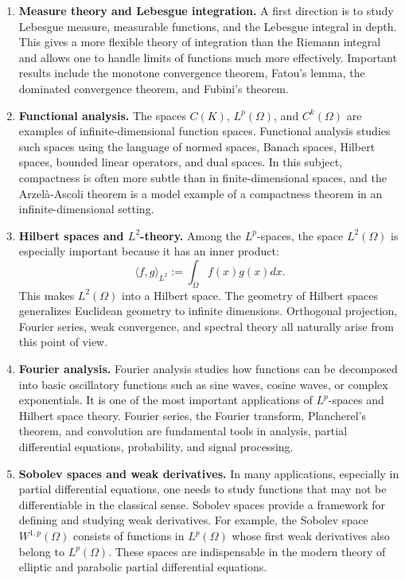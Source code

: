 \begin{enumerate}
    \item \textbf{Measure theory and Lebesgue integration.} A first direction is to study Lebesgue measure, measurable functions, and the Lebesgue integral in depth. This gives a more flexible theory of integration than the Riemann integral and allows one to handle limits of functions much more effectively. Important results include the monotone convergence theorem, Fatou's lemma, the dominated convergence theorem, and Fubini's theorem.
    
    \item \textbf{Functional analysis.} The spaces $C(K)$, $L^{p}(\Omega)$, and $C^{k}(\Omega)$ are examples of infinite-dimensional function spaces. Functional analysis studies such spaces using the language of normed spaces, Banach spaces, Hilbert spaces, bounded linear operators, and dual spaces. In this subject, compactness is often more subtle than in finite-dimensional spaces, and the Arzelà-Ascoli theorem is a model example of a compactness theorem in an infinite-dimensional setting.
    
    \item \textbf{Hilbert spaces and $L^{2}$-theory.} Among the $L^p$-spaces, the space $L^{2}(\Omega)$ is especially important because it has an inner product:
    \[ \langle f,g \rangle_{L^{2}} := \int_{\Omega} f(x)g(x) dx. \]
    This makes $L^{2}(\Omega)$ into a Hilbert space. The geometry of Hilbert spaces generalizes Euclidean geometry to infinite dimensions. Orthogonal projection, Fourier series, weak convergence, and spectral theory all naturally arise from this point of view.
    
    \item \textbf{Fourier analysis.} Fourier analysis studies how functions can be decomposed into basic oscillatory functions such as sine waves, cosine waves, or complex exponentials. It is one of the most important applications of $L^p$-spaces and Hilbert space theory. Fourier series, the Fourier transform, Plancherel's theorem, and convolution are fundamental tools in analysis, partial differential equations, probability, and signal processing.
    
    \item \textbf{Sobolev spaces and weak derivatives.} In many applications, especially in partial differential equations, one needs to study functions that may not be differentiable in the classical sense. Sobolev spaces provide a framework for defining and studying weak derivatives. For example, the Sobolev space $W^{1,p}(\Omega)$ consists of functions in $L^{p}(\Omega)$ whose first weak derivatives also belong to $L^{p}(\Omega)$. These spaces are indispensable in the modern theory of elliptic and parabolic partial differential equations.
    

\end{enumerate}

